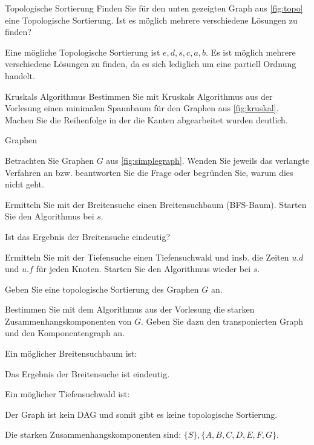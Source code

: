 \documentclass{article}
\begin{document}
\begin{exercise}{Topologische Sortierung}
  Finden Sie für den unten gezeigten Graph aus \ref{fig:topo} eine Topologische Sortierung. Ist es möglich mehrere verschiedene Lösungen zu finden?
  

  \begin{solution}
    Eine mögliche Topologische Sortierung ist $e, d, s, c, a, b$. Es ist möglich mehrere verschiedene Lösungen zu finden, da es sich lediglich um eine partiell Ordnung handelt.
  \end{solution}
\end{exercise}

\begin{exercise}{Kruskals Algorithmus}
  Bestimmen Sie mit Kruskals Algorithmus aus der Vorlesung einen minimalen Spannbaum für den Graphen aus \ref{fig:kruskal}. Machen Sie die Reihenfolge in der die Kanten abgearbeitet wurden deutlich.
  

  \begin{solution}\end{solution}
\end{exercise}

\begin{eexercises}{Graphen}{
    Betrachten Sie Graphen $G$ aus \ref{fig:simplegraph}. Wenden Sie jeweils das verlangte Verfahren an bzw. beantworten Sie die Frage oder begründen Sie, warum dies nicht geht.
    
  }
  \item Ermitteln Sie mit der Breitensuche einen Breitensuchbaum (BFS-Baum). Starten Sie den Algorithmus bei $s$.
  \item Ist das Ergebnis der Breitensuche eindeutig?
  \item Ermitteln Sie mit der Tiefensuche einen Tiefensuchwald und insb. die Zeiten $u.d$ und $u.f$ für jeden Knoten. Starten Sie den Algorithmus wieder bei $s$.
  \item Geben Sie eine topologische Sortierung des Graphen $G$ an.
  \item Bestimmen Sie mit dem Algorithmus aus der Vorlesung die starken Zusammenhangskomponenten von $G$. Geben Sie dazu den transponierten Graph und den Komponentengraph an.
\end{eexercises}

\begin{solutions}
  \item Ein möglicher Breitensuchbaum ist: 
  \item Das Ergebnis der Breitensuche ist eindeutig.
  \item Ein möglicher Tiefensuchwald ist: 
  \item Der Graph ist kein DAG und somit gibt es keine topologische Sortierung.
  \item Die starken Zusammenhangskomponenten sind: $\{S\}, \{A, B, C, D, E, F, G\}$. 
\end{solutions}
\end{document}
